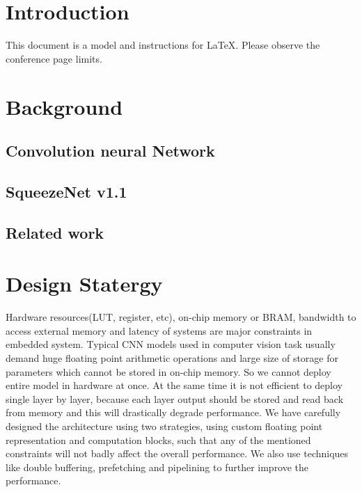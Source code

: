 \documentclass[conference]{IEEEtran}
\begin{document}
\section{Introduction}
This document is a model and instructions for \LaTeX.
Please observe the conference page limits. 

\section{Background}

\subsection{Convolution neural Network}
\subsection{SqueezeNet v1.1}
\subsection{Related work}


\section{Design Statergy}
Hardware resources(LUT, register, etc), on-chip memory or BRAM, bandwidth to access external memory and latency of systems are major constraints in embedded system. Typical CNN models used in computer vision task usually demand huge floating point arithmetic operations and large size of storage for parameters which cannot be stored in on-chip memory. So we cannot deploy entire model in hardware at once. At the same time it is not efficient to deploy single layer by layer, because each layer output should be stored and read back from memory and this will drastically degrade performance. We have carefully designed the architecture using two strategies, using custom floating point representation and computation blocks, such that any of the mentioned constraints will not badly affect the overall performance.  We also use techniques like double buffering, prefetching and pipelining to further improve the performance. 
\end{document}
